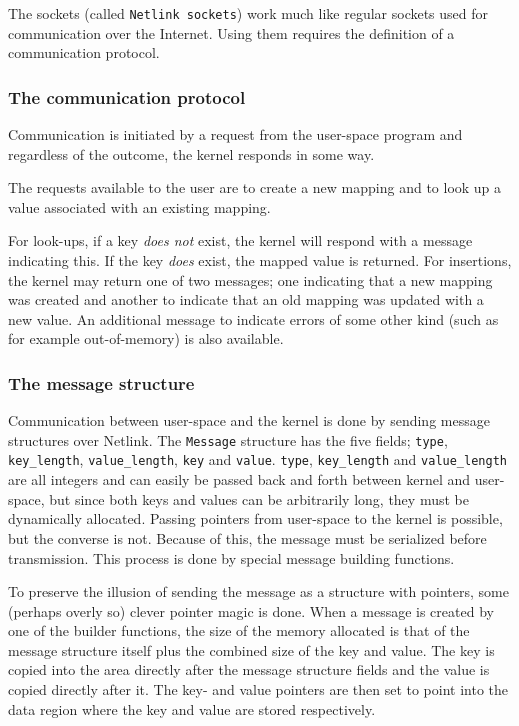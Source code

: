 \documentclass[final,a4paper]{article}
\begin{document}
The sockets (called \texttt{Netlink sockets}) work much like regular sockets
used for communication over the Internet. Using them requires the definition
of a communication protocol.

\subsubsection*{The communication protocol}
Communication is initiated by a request from the user-space program and
regardless of the outcome, the kernel responds in some way.

The requests available to the user are to create a new mapping and to look up
a value associated with an existing mapping.

For look-ups, if a key \emph{does not} exist, the kernel will respond with a
message indicating this. If the key \emph{does} exist, the mapped value is
returned. For insertions, the kernel may return one of two messages; one
indicating that a new mapping was created and another to indicate that an old
mapping was updated with a new value. An additional message to indicate errors
of some other kind (such as for example out-of-memory) is also available.

\subsubsection*{The message structure}
Communication between user-space and the kernel is done by sending message
structures over Netlink. The \texttt{Message} structure has the five fields;
\texttt{type}, \texttt{key\_length}, \texttt{value\_length}, \texttt{key} and
\texttt{value}. \texttt{type}, \texttt{key\_length} and \texttt{value\_length}
are all integers and can easily be passed back and forth between kernel and
user-space, but since both keys and values can be arbitrarily long, they must
be dynamically allocated. Passing pointers from user-space to the kernel is
possible, but the converse is not. Because of this, the message must be
serialized before transmission. This process is done by special message building
functions.

To preserve the illusion of sending the message as a structure with pointers,
some (perhaps overly so) clever pointer magic is done. When a message is
created by one of the builder functions, the size of the memory allocated is
that of the message structure itself plus the combined size of the key and
value. The key is copied into the area directly after the message structure
fields and the value is copied directly after it. The key- and value pointers
are then set to point into the data region where the key and value are stored
respectively.
\end{document}
